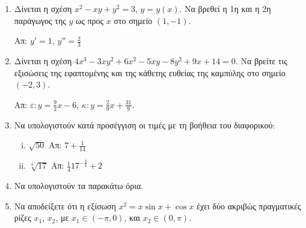 \begin{enumerate}
\item Δίνεται η σχέση $ x^{2} - xy + y^{2} = 3 $, $ y=y(x) $. Να βρεθεί η 1η
  και η 2η παράγωγος της $y$ ως προς $x$ στο σημείο $ (1,-1) $.

  \hfill Απ: $ y' = 1$, $ y'' = \frac{2}{3} $

\item Δίνεται η σχέση $ 4x^{3} - 3xy^{2} + 6x^{2} - 5xy - 8 y^{2} + 9x + 14
  = 0$. Να βρείτε τις εξισώσεις της εφαπτομένης και της κάθετης ευθείας
  της καμπύλης στο σημείο $ (-2,3) $.

  \hfill Απ: $\varepsilon\colon y = \frac{9}{2} x - 6 $, 
  $\kappa\colon y = \frac{2}{9} x + \frac{31}{9} $.

\item Να υπολογιστούν κατά προσέγγιση οι τιμές με τη βοήθεια του διαφορικού:
  \begin{enumerate}[i)]
    \item $\sqrt{50}$ \hfill Απ: $7+\frac{1}{14}$
    \item $\sqrt[4]{17}$ \hfill Απ: $\frac{1}{4}17^{-\frac{3}{4}}+2$
  \end{enumerate}

\item Να υπολογιστούν τα παρακάτω όρια.
  \begin{enumerate}[(i)]
\end{enumerate}

  \item Να αποδείξετε ότι η εξίσωση $ x^{2} = x \sin{x} + \cos{x} $ έχει δύο ακριβώς
    πραγματικές ρίζες $ x_{1} $, $ x_{2} $, με $ x_{1} \in (-\pi, 0) $, και
    $x_{2} \in (0, \pi) $.


\end{enumerate}

